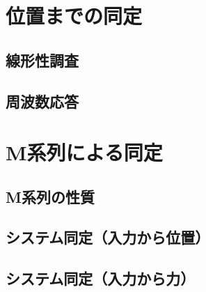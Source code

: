 \section{位置までの同定}
\subsection{線形性調査}
\subsection{周波数応答}
\section{M系列による同定}
\subsection{M系列の性質}
\subsection{システム同定（入力から位置）}
\subsection{システム同定（入力から力）}

